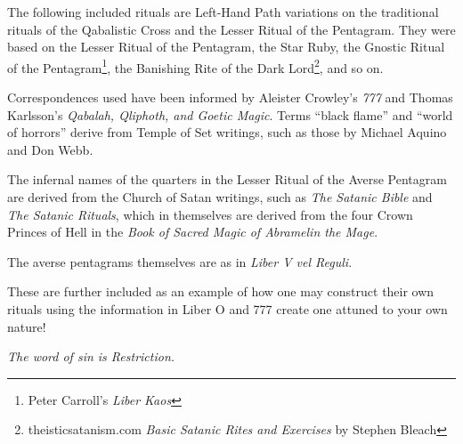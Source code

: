 \raggedbottom
{}

The following included rituals are Left-Hand Path variations on the traditional rituals of the Qabalistic Cross and the Lesser Ritual of the Pentagram. They were based on the Lesser Ritual of the Pentagram, the Star Ruby, the Gnostic Ritual of the Pentagram\footnote{Peter Carroll's \textit{Liber Kaos}}, the Banishing Rite of the Dark Lord\footnote{theisticsatanism.com \textemdash{} \textit{Basic Satanic Rites and Exercises} by Stephen Bleach}, and so on.

Correspondences used have been informed by Aleister Crowley's \textit{777} and Thomas Karlsson's \textit{Qabalah, Qliphoth, and Goetic Magic}. Terms \enquote{black flame} and \enquote{world of horrors} derive from Temple of Set writings, such as those by Michael Aquino and Don Webb.

The infernal names of the quarters in the Lesser Ritual of the Averse Pentagram are derived from the Church of Satan writings, such as \textit{The Satanic Bible} and \textit{The Satanic Rituals}, which in themselves are derived from the four Crown Princes of Hell in the \textit{Book of Sacred Magic of Abramelin the Mage}.

The averse pentagrams themselves are as in \textit{Liber V vel Reguli}.

These are further included as an example of how one may construct their own rituals using the information in Liber O and 777 \textemdash{} create one attuned to your own nature!

\textit{The word of sin is Restriction.}
